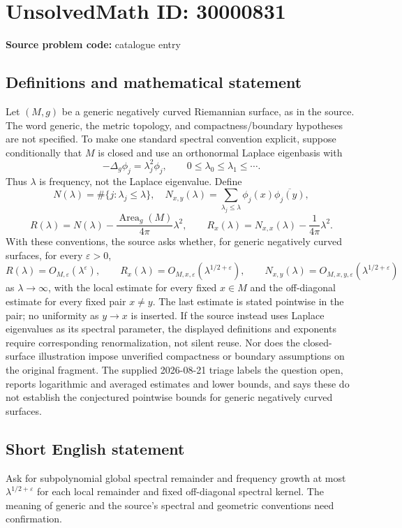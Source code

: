 \documentclass[11pt]{article}
\begin{document}
\section*{UnsolvedMath ID: 30000831}
\textbf{Source problem code:} catalogue entry
\subsection{Definitions and mathematical statement}
Let $(M,g)$ be a generic negatively curved Riemannian surface, as in the source. The word generic, the metric topology, and compactness/boundary hypotheses are not specified. To make one standard spectral convention explicit, suppose conditionally that $M$ is closed and use an orthonormal Laplace eigenbasis with \[-\Delta_g\phi_j=\lambda_j^2\phi_j,\qquad0\leq\lambda_0\leq\lambda_1\leq\cdots.\] Thus $\lambda$ is frequency, not the Laplace eigenvalue. Define \[N(\lambda)=\#\{j:\lambda_j\leq\lambda\},\quad N_{x,y}(\lambda)=\sum_{\lambda_j\leq\lambda}\phi_j(x)\overline{\phi_j(y)},\] \[R(\lambda)=N(\lambda)-\frac{\operatorname{Area}_g(M)}{4\pi}\lambda^2,\qquad R_x(\lambda)=N_{x,x}(\lambda)-\frac{1}{4\pi}\lambda^2.\] With these conventions, the source asks whether, for generic negatively curved surfaces, for every $\varepsilon>0$, \[R(\lambda)=O_{M,\varepsilon}(\lambda^\varepsilon),\qquad R_x(\lambda)=O_{M,x,\varepsilon}(\lambda^{1/2+\varepsilon}),\qquad N_{x,y}(\lambda)=O_{M,x,y,\varepsilon}(\lambda^{1/2+\varepsilon})\] as $\lambda\to\infty$, with the local estimate for every fixed $x\in M$ and the off-diagonal estimate for every fixed pair $x\ne y$. The last estimate is stated pointwise in the pair; no uniformity as $y\to x$ is inserted. If the source instead uses Laplace eigenvalues as its spectral parameter, the displayed definitions and exponents require corresponding renormalization, not silent reuse. Nor does the closed-surface illustration impose unverified compactness or boundary assumptions on the original fragment. The supplied 2026-08-21 triage labels the question open, reports logarithmic and averaged estimates and lower bounds, and says these do not establish the conjectured pointwise bounds for generic negatively curved surfaces.
\subsection{Short English statement}
Ask for subpolynomial global spectral remainder and frequency growth at most $\lambda^{1/2+\varepsilon}$ for each local remainder and fixed off-diagonal spectral kernel. The meaning of generic and the source's spectral and geometric conventions need confirmation.
\end{document}
